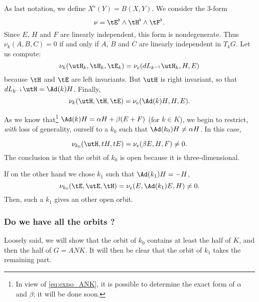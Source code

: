 As last notation, we define $X^{\flat}(Y)=B(X,Y)$. We consider the $3$-form 
\[
   \nu=\tE^{\flat}\wedge\tH^{\flat}\wedge\tF^{\flat}.
\]
Since $E$, $H$ and $F$ are linearly independent, this form is nondegenerate. Thus $\nu_k(A,B,C)=0$ if and only if $A$, $B$ and $C$ are linearly independent in $T_kG$. Let us compute:
\[
\nu_k(\utH_k,\tH_k,\tE_k)=\nu_e(dL_{k^{-1}}\utH_k,H,E)
\]
because $\tH$ and $\tE$ are left invariants. But $\utH$ is right invariant, so that $dL_{k^{-1}}\utH=\Ad(k)H$. Finally,
\begin{equation}
\nu_k(\utH,\tH,\tE)=\nu_e(\Ad(k)H,H,E).
\end{equation}


As we know that\footnote{In view of \eqref{eq:expo_ANK}, it is possible to determine the exact form of $\alpha$ and $\beta$; it will be done soon.} $\Ad(k)H=\alpha H+\beta(E+F)$ (for $k\in K$), we begin to restrict, \emph{with} loss of generality,  ourself to a $k_0$ such that $\Ad(k_0)H\neq\alpha H$. In this case, 
  
\begin{equation}
   \nu_{k_0}(\utH,tH,tE)=\nu_e(\beta E,H,F)\neq 0.
\end{equation}
The conclusion is that the orbit of $k_0$ is open because it is three-dimensional.

If on the other hand we chose $k_1$ such that $\Ad(k_1)H=-H$,
\[
   \nu_{k_0}(\tE,\utE,\tH)=\nu_e(E,\Ad(k_1)E,H)\neq 0.
\]
Then, such a $k_1$ gives an other open orbit.

\subsubsection{Do we have all the orbits ?}

Loosely said, we will show that the orbit of $k_0$ contains at least the half of $K$, and then the half of $G=ANK$. It will then be clear that the orbit of $k_1$ takes the remaining part.

